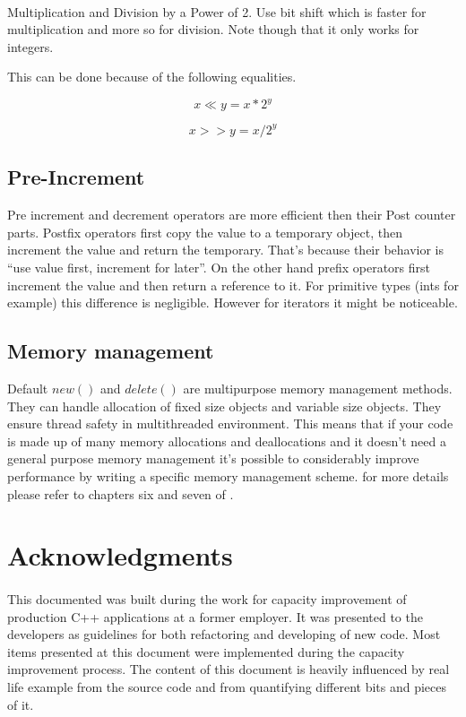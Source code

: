 \documentclass{article}
\begin{document}
 \paragraph{}
   Multiplication and Division by a Power of 2. Use bit shift which is faster for multiplication and more so for division.
  Note though that it only works for integers.
 
 This can be done because of the following equalities.
  
 \begin{displaymath}
             x\ll  y  =   x * 2^y
 \end{displaymath}

 \begin{displaymath}
     x >> y  =   x / 2^y
 \end{displaymath}

        \subsection {Pre-Increment}
  Pre increment and decrement operators are more efficient then their Post counter parts. 
  Postfix operators first copy the value to a temporary object, then increment the value and return the temporary. That's because their behavior is ``use value first, increment for later''. 
  On the other hand prefix operators first increment the value and then return a reference to it.
  For primitive types (ints for example) this difference is negligible. However for iterators it might be noticeable.
  
 \subsection{Memory management}
 Default $new()$ and $delete()$ are multipurpose memory management methods. 
 They can handle allocation of fixed size objects and variable size objects. 
 They ensure thread safety in multithreaded environment.
  This means that if your code is made up of many memory allocations and deallocations and it doesn't need a general purpose memory management 
 it's possible to considerably improve performance by writing a specific memory management scheme.
 for more details please refer to chapters six and seven of \cite{2}.
 
\section{Acknowledgments}
 \paragraph{}
 This documented was built during the work for capacity improvement of production C++ applications at a former employer. 
 It was presented to the developers as guidelines for both refactoring and developing of new code.
 Most items  presented at this document were implemented during the capacity improvement process.
 The content of this document is heavily influenced by real life example from the source code and from quantifying different bits and pieces of it.
 
\end{document}
